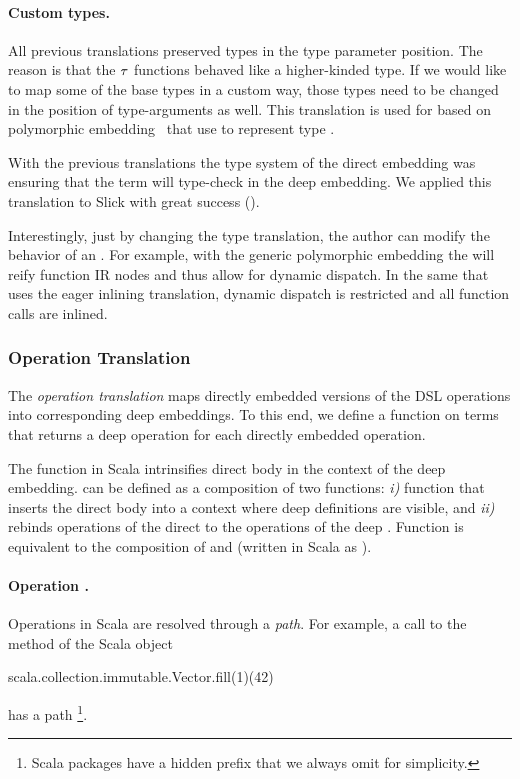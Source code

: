 \paragraph{Custom types.} All previous translations preserved types in the type parameter position. The reason is that the $\tau$ functions behaved like a higher-kinded type. If we would like to map some of the base types in a custom way, those types need to be changed in the position of type-arguments as well. This translation is used for \edsls based on polymorphic embedding~\cite{hofer_polymorphic_2008} that use  to represent type .

With the previous translations the type system of the direct embedding was
ensuring that the term will type-check in the deep embedding. We applied this
translation to Slick \cite{slick} with great success ().

Interestingly, just by changing the type translation, the \edsl author can modify the behavior of an \edsl.  For example, with the generic polymorphic embedding the \edsl will reify function IR nodes and thus allow for dynamic dispatch. In the same \edsl that uses the eager inlining translation, dynamic dispatch is restricted and all function calls are inlined.

\subsubsection{Operation Translation}
\label{sec:operation-translation}

The \emph{operation translation} maps directly embedded versions of the
  DSL operations into corresponding deep embeddings. To this end, we define a
  function  on terms that returns a deep operation for each directly
  embedded operation.

The  function in Scala intrinsifies direct \edsl body in the context of the deep embedding.
  can be defined as a composition of two functions: \emph{i)} function  that inserts the direct \edsl body
  into a context where deep \edsl definitions are visible, and \emph{ii)} 
  rebinds operations of the direct \edsl to the operations of the deep \edsl. Function  is equivalent to
  the composition of  and  (written in Scala as ).

\paragraph{Operation .} Operations in Scala are resolved through a \emph{path}. For example, a call to the  method
  of the Scala object \begin{lstparagraph}
scala.collection.immutable.Vector.fill(1)(42)
\end{lstparagraph}
  has a path \footnote{Scala packages have a hidden prefix  that we always omit for simplicity.}.

